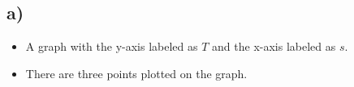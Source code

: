 

\subsection*{a)}

\begin{itemize}
    \item A graph with the y-axis labeled as $T$ and the x-axis labeled as $s$.
    \item There are three points plotted on the graph.
\end{itemize}